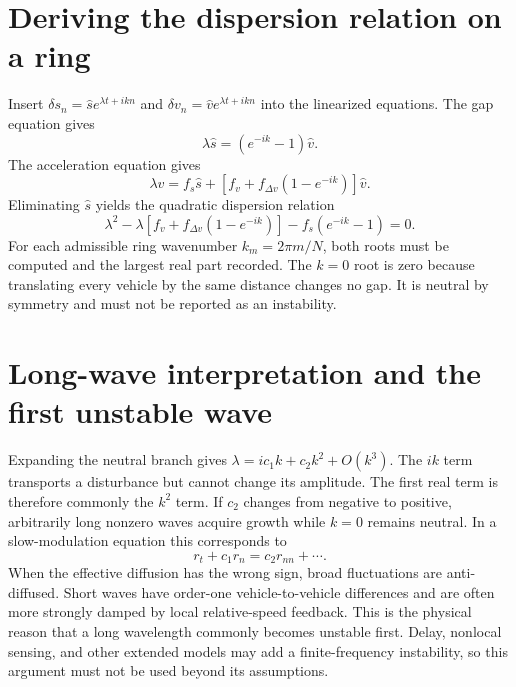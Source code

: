 \documentclass[11pt,a4paper,openany]{book}
\numberwithin{equation}{chapter}
\numberwithin{figure}{chapter}
\numberwithin{table}{chapter}
\begin{document}
\section{Deriving the dispersion relation on a ring}
Insert $\delta s_n=\hat s e^{\lambda t+ikn}$ and $\delta v_n=\hat v e^{\lambda t+ikn}$ into the linearized equations. The gap equation gives
\begin{equation}
\lambda\hat s=(e^{-ik}-1)\hat v.
\end{equation}
The acceleration equation gives
\begin{equation}
\lambda\hat v=f_s\hat s+\left[f_v+f_{\Delta v}(1-e^{-ik})\right]\hat v.
\end{equation}
Eliminating $\hat s$ yields the quadratic dispersion relation
\begin{equation}
\lambda^2-\lambda\left[f_v+f_{\Delta v}(1-e^{-ik})\right]
-f_s(e^{-ik}-1)=0.
\end{equation}
For each admissible ring wavenumber $k_m=2\pi m/N$, both roots must be computed and the largest real part recorded. The $k=0$ root is zero because translating every vehicle by the same distance changes no gap. It is neutral by symmetry and must not be reported as an instability.

\section{Long-wave interpretation and the first unstable wave}
Expanding the neutral branch gives $\lambda=ic_1k+c_2k^2+O(k^3)$. The $ik$ term transports a disturbance but cannot change its amplitude. The first real term is therefore commonly the $k^2$ term. If $c_2$ changes from negative to positive, arbitrarily long nonzero waves acquire growth while $k=0$ remains neutral. In a slow-modulation equation this corresponds to
\begin{equation}
r_t+c_1r_n=c_2r_{nn}+\cdots .
\end{equation}
When the effective diffusion has the wrong sign, broad fluctuations are anti-diffused. Short waves have order-one vehicle-to-vehicle differences and are often more strongly damped by local relative-speed feedback. This is the physical reason that a long wavelength commonly becomes unstable first. Delay, nonlocal sensing, and other extended models may add a finite-frequency instability, so this argument must not be used beyond its assumptions.
\end{document}
